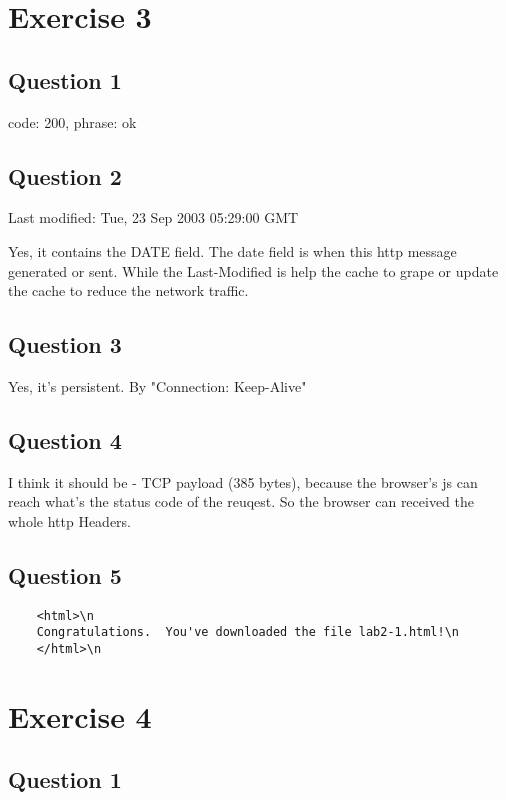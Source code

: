 \documentclass{article}
\begin{document}
\section{Exercise 3}

\subsection{Question 1}

code: 200, phrase: ok 

\subsection{Question 2}

Last modified: Tue, 23 Sep 2003 05:29:00 GMT

Yes, it contains the DATE field. The date field is when this http message generated or sent. While the Last-Modified is help the cache to grape or update the cache to reduce the network traffic.

\subsection{Question 3}

Yes, it's persistent. By "Connection: Keep-Alive"

\subsection{Question 4}

I think it should be - TCP payload (385 bytes), because the browser's js can reach what's the status code of the reuqest. So the browser can received the whole http Headers.

\subsection{Question 5}

\begin{lstlisting}
    <html>\n
    Congratulations.  You've downloaded the file lab2-1.html!\n
    </html>\n
\end{lstlisting}

\section{Exercise 4}

\subsection{Question 1}
\end{document}
